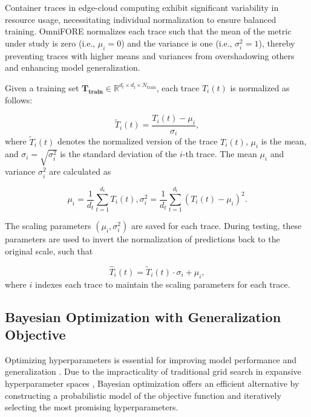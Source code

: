 \documentclass{ieeetmlcn}
\begin{document}
Container traces in edge-cloud computing exhibit significant variability in resource usage, necessitating individual normalization to ensure balanced training. OmniFORE normalizes each trace such that the mean of the metric under study is zero (i.e., $\mu_i=0$) and the variance is one (i.e., $\sigma_i^2=1$), thereby preventing traces with higher means and variances from overshadowing others and enhancing model generalization.

Given a training set $\mathbf{T_{\text{train}}} \in \mathbb{R}^{d_t \times d_{\text{f}} \times N_{\text{train}}}$, each trace $T_i(t)$ is normalized as follows:

\begin{equation}
\tilde{T}_i(t) = \frac{T_i(t) - \mu_i}{\sigma_i},  
\end{equation}
where $\tilde{T}_i(t)$ denotes the normalized version of the trace $T_i(t)$, \(\mu_i\) is the mean, and \(\sigma_i = \sqrt{\sigma_i^2}\) is the standard deviation of the \(i\)-th trace. The mean \(\mu_i\) and variance \(\sigma_i^2\) are calculated as

\begin{equation}
\mu_i = \frac{1}{d_t} \sum_{t=1}^{d_t} T_i(t),   \sigma_i^2 = \frac{1}{d_t} \sum_{t=1}^{d_t} (T_i(t) - \mu_i)^2.
\end{equation}

The scaling parameters $(\mu_i, \sigma_i^2)$ are saved for each trace. During testing, these parameters are used to invert the normalization of predictions back to the original scale, such that

\begin{equation}
\hat{T}_i(t) = \tilde{T}_i(t) \cdot \sigma_i + \mu_i,
\end{equation}
where $i$ indexes each trace to maintain the scaling parameters for each trace.

\subsection{Bayesian Optimization with Generalization Objective}
\label{sec:BayesianOptimizationWithGeneralizationObjective}

Optimizing hyperparameters is essential for improving model performance and generalization \cite{hyperparamsdatasets}. Due to the impracticality of traditional grid search in expansive hyperparameter spaces \cite{gridsearchvsbayesian}, Bayesian optimization \cite{frazier2018tutorial} offers an efficient alternative by constructing a probabilistic model of the objective function and iteratively selecting the most promising hyperparameters.
\end{document}
